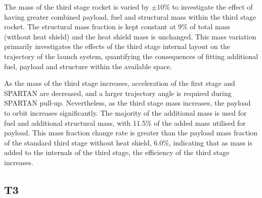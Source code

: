 The mass of the third stage rocket is varied by $\pm10\%$ to investigate the effect of having greater combined  payload, fuel and structural mass within the third stage rocket. The structural mass fraction is kept constant at 9\% of total mass (without heat shield) and the heat shield mass is unchanged. This mass variation primarily investigates the effects of the third stage internal layout on the trajectory of the launch system, quantifying the consequences of fitting additional fuel, payload and structure within the available space.
  
 As the mass of the third stage increases, acceleration of the first stage and SPARTAN are decreased, and a larger trajectory angle is required during SPARTAN pull-up. Nevertheless, as the third stage mass increases, the payload to orbit increases significantly.
The majority of the additional mass is used for fuel and additional structural mass, with 11.5\% of the added mass utilised for payload. This mass fraction change rate is greater than the payload mass fraction of the standard third stage without heat shield, 6.0\%, indicating that as mass is added to the internals of the third stage, the efficiency of the third stage increases.


\subsection{T3}

